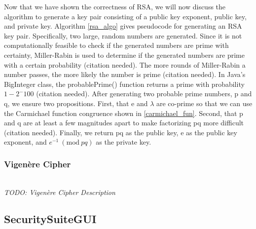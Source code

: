 \documentclass[acmlarge]{acmart}
\newcommand{\Mod}[1]{\ (\mathrm{mod}\ #1)}
\begin{document}
Now that we have shown the correctness of RSA, we will now discuss the algorithm to generate a key pair consisting of a public key exponent, public key, and private key. Algorithm \ref{rsa_algo} gives pseudocode for generating an RSA key pair. Specifically, two large, random numbers are generated. Since it is not computationally feasible to check if the generated numbers are prime with certainty, Miller-Rabin is used to determine if the generated numbers are prime with a certain probability (citation needed). The more rounds of Miller-Rabin a number passes, the more likely the number is prime (citation needed). In Java's BigInteger class, the probablePrime() function returns a prime with probability $1 - 2^-100$ (citation needed). After generating two probable prime numbers, p and q, we ensure two propositions. First, that e and $\lambda$ are co-prime so that we can use the Carmichael function congruence shown in \ref{carmichael_fun}. Second, that p and q are at least a few magnitudes apart to make factorizing pq more difficult (citation needed). Finally, we return pq as the public key, e as the public key exponent, and $e^{-1} \Mod{pq}$ as the private key.


\subsubsection{Vigenère Cipher}
\hspace*{\fill} \\ %
\textit{TODO: Vigenère Cipher Description}

\subsection{SecuritySuiteGUI}\label{sec:gui}
\end{document}
